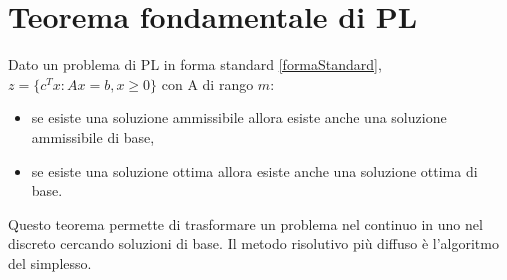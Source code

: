 \section{Teorema fondamentale di PL}
Dato un problema di PL in forma standard \ref{formaStandard}, $z=\{c^Tx:Ax=b, x\geq0\}$ con A di rango $m$:
\begin{itemize}
    \item se esiste una soluzione ammissibile allora esiste anche una soluzione ammissibile di base,
    \item se esiste una soluzione ottima allora esiste anche una soluzione ottima di base.
\end{itemize}
Questo teorema permette di trasformare un problema nel continuo in uno nel discreto cercando soluzioni di base. 
Il metodo risolutivo più diffuso è l'algoritmo del simplesso.

